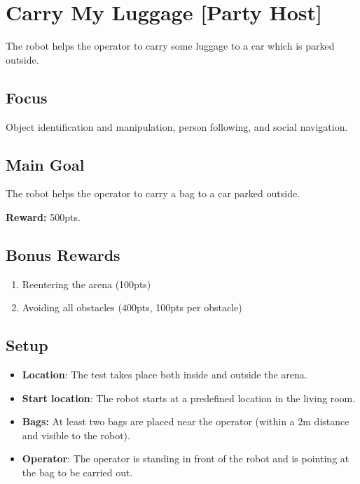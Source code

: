 \section{Carry My Luggage [Party Host]}
\label{test:carry-my-luggage}
The robot helps the operator to carry some luggage to a car which is parked outside.

\subsection*{Focus}
Object identification and manipulation, person following, and social navigation.

\subsection*{Main Goal}
The robot helps the operator to carry a bag to a car parked outside.

\noindent\textbf{Reward:} 500pts.

\subsection*{Bonus Rewards}
\begin{enumerate}[nosep]
	\item Reentering the arena (100pts)
	\item Avoiding all obstacles (400pts, 100pts per obstacle)
\end{enumerate}


\subsection*{Setup}
\begin{itemize}[nosep]
	\item \textbf{Location}: The test takes place both inside and outside the arena.
	\item \textbf{Start location}: The robot starts at a predefined location in the living room.
	\item \textbf{Bags:} At least two bags are placed near the operator (within a 2m distance and visible to the robot).
	\item \textbf{Operator}: The operator is standing in front of the robot and is pointing at the bag to be carried out.
\end{itemize}

